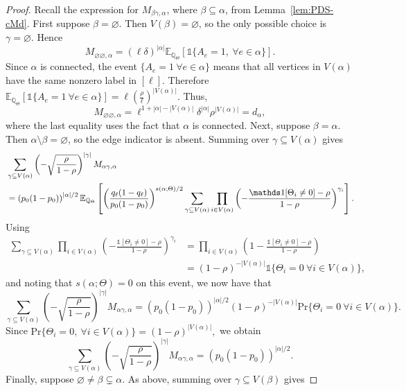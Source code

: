 \documentclass[11pt, letterpaper]{article}
\numberwithin{equation}{section}
\newcommand{\E}{\mathbb{E}}
\newcommand{\QQ}{\mathbb{Q}}
\begin{document}
\begin{proof}
    Recall the expression for $M_{\beta\gamma,\alpha}$, where $\beta\subseteq\alpha$, from Lemma~\ref{lem:PDS-cMd}. First suppose $\beta=\varnothing$. Then $V(\beta)=\varnothing$, so the only possible choice is $\gamma=\varnothing$. Hence
\[
M_{\varnothing\varnothing,\alpha}=(\ell\delta)^{|\alpha|}
\E_{\QQ_\Theta} \left[\mathds 1\{A_e=1,\ \forall e\in\alpha\}\right].
\]
Since $\alpha$ is connected, the event $\{A_e=1\ \forall e\in\alpha\}$ means that all vertices in $V(\alpha)$ have the same nonzero label in $[\ell]$. Therefore $
\E_{\QQ_\Theta} \left[\mathds 1\{A_e=1\ \forall e\in\alpha\}\right]=
\ell\left(\frac{\rho}{\ell}\right)^{|V(\alpha)|}.$
Thus,
\[
M_{\varnothing\varnothing,\alpha}
=
\ell^{1+|\alpha|-|V(\alpha)|}\delta^{|\alpha|}\rho^{|V(\alpha)|}=d_\alpha,
\]
where the last equality uses the fact that $\alpha$ is connected. Next, suppose $\beta=\alpha$. Then $\alpha\setminus\beta=\varnothing$, so the edge indicator is absent. Summing over $\gamma\subseteq V(\alpha)$ gives
\begin{align}
\notag
&\sum_{\gamma\subseteq V(\alpha)}
\left(-\sqrt{\frac{\rho}{1-\rho}}\right)^{|\gamma|}
M_{\alpha\gamma,\alpha} \\
\notag
&=
\left(p_0(1-p_0)\right)^{|\alpha|/2}
\E_{\QQ_\Theta} \left[
\left(\frac{q_\ell(1-q_\ell)}{p_0(1-p_0)}\right)^{s(\alpha;\Theta)/2}
\sum_{\gamma\subseteq V(\alpha)}
\prod_{i\in V(\alpha)}
\left(-\frac{\mathds 1[\Theta_i\neq0]-\rho}{1-\rho}\right)^{\gamma_i}
\right].
\end{align}
Using
\begin{align*}
\sum_{\gamma\subseteq V(\alpha)}
\prod_{i\in V(\alpha)}
\left(-\frac{\mathds 1[\Theta_i\neq0]-\rho}{1-\rho}\right)^{\gamma_i}&= \prod_{i\in V(\alpha)} \left(1-\frac{\mathds 1[\Theta_i\neq0]-\rho}{1-\rho}\right)\\
&=(1-\rho)^{-|V(\alpha)|} \mathds 1\{\Theta_i=0\ \forall i\in V(\alpha)\},
\end{align*}
and noting that \(s(\alpha;\Theta)=0\) on this event, we now have that
\[ \sum_{\gamma\subseteq V(\alpha)}
\left(-\sqrt{\frac{\rho}{1-\rho}}\right)^{|\gamma|}
M_{\alpha\gamma,\alpha} = \left(p_0(1-p_0)\right)^{|\alpha|/2}
(1-\rho)^{-|V(\alpha)|}
\mathrm{Pr}\{\Theta_i=0\ \forall i\in V(\alpha)\}.
\]
Since $\mathrm{Pr}\{\Theta_i=0,\ \forall i\in V(\alpha)\}=(1-\rho)^{|V(\alpha)|},$
we obtain
\[\sum_{\gamma\subseteq V(\alpha)}
\left(-\sqrt{\frac{\rho}{1-\rho}}\right)^{|\gamma|}M_{\alpha\gamma,\alpha}=\left(p_0(1-p_0)\right)^{|\alpha|/2}.
\]
Finally, suppose $\varnothing \neq \beta \subsetneq \alpha$. As above, summing over $\gamma \subseteq V(\beta)$ gives 

\end{proof}
\end{document}
